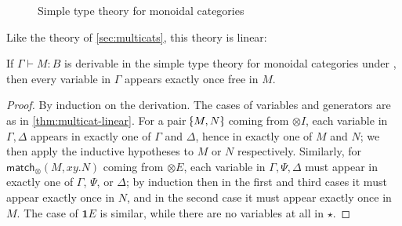 \documentclass{book}
\let\types\vdash
\def\type{\;\ftype}
\def\match{\mathsf{match}}
\def\one{\mathbf{1}}
\def\ott{\mathord{\star}}%
\let\tensor\otimes
\def\tensorI{\mathord{\tensor}I}
\def\tensorE{\mathord{\tensor}E}
\def\tpair#1#2{\text{\textlquill} #1,#2 \text{\textrquill}}%
\begin{document}
\begin{figure}
  \centering
  \caption{Simple type theory for monoidal categories}
  \label{fig:moncat}
\end{figure}

Like the theory of \cref{sec:multicats}, this theory is linear:

\begin{lem}\label{thm:moncat-linear}
  If $\Gamma\types M:B$ is derivable in the simple type theory for monoidal categories under \cG, then every variable in $\Gamma$ appears exactly once free in $M$.
\end{lem}
\begin{proof}
  By induction on the derivation.
  The cases of variables and generators are as in \cref{thm:multicat-linear}.
  For a pair $\tpair M N$ coming from $\tensorI$, each variable in $\Gamma,\Delta$ appears in exactly one of $\Gamma$ and $\Delta$, hence in exactly one of $M$ and $N$; we then apply the inductive hypotheses to $M$ or $N$ respectively.
  Similarly, for $\match_\tensor(M,xy.N)$ coming from $\tensorE$, each variable in $\Gamma,\Psi,\Delta$ must appear in exactly one of $\Gamma$, $\Psi$, or $\Delta$; by induction then in the first and third cases it must appear exactly once in $N$, and in the second case it must appear exactly once in $M$.
  The case of $\one E$ is similar, while there are no variables at all in $\ott$.
\end{proof}
\end{document}
